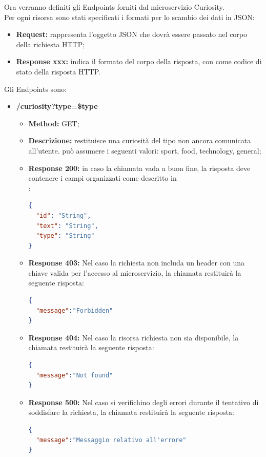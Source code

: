 Ora verranno definiti gli Endpoints forniti dal microservizio Curiosity.\\
Per ogni risorsa sono stati specificati i formati per lo scambio dei dati in JSON:
\begin{itemize}
\item \textbf{Request:} rappresenta l’oggetto JSON che dovrà essere passato nel corpo della richiesta HTTP;
\item \textbf{Response xxx:} indica il formato del corpo della risposta, con  come codice di stato della risposta HTTP.
\end{itemize}
Gli Endpoints sono:
\begin{itemize}
\item \textbf{/curiosity?type=\$type}\\
\begin{itemize}
\item \textbf{Method:} GET;
\item \textbf{Descrizione:} restituisce una curiosità del tipo  non ancora comunicata all'utente.  può assumere i seguenti valori: sport, food, technology, general;
\item \textbf{Response 200:} in caso la chiamata vada a buon fine, la risposta deve contenere i campi organizzati come descritto in \\:
\begin{lstlisting}[language=json,firstnumber=1]
{
  "id": "String",
  "text": "String",
  "type": "String"
}
\end{lstlisting}
\item \textbf{Response 403:} Nel caso la richiesta non includa un header  con una chiave valida per l'accesso al microservizio, la chiamata restituirà la seguente risposta:
\begin{lstlisting}[language=json,firstnumber=1]
{
  "message":"Forbidden"
}
\end{lstlisting}
\item \textbf{Response 404:} Nel caso la risorsa richiesta non sia disponibile, la chiamata restituirà la seguente risposta:
\begin{lstlisting}[language=json,firstnumber=1]
{
  "message":"Not found"
}
\end{lstlisting}
\item \textbf{Response 500:} Nel caso si verifichino degli errori durante il tentativo di soddisfare la richiesta, la chiamata restituirà la seguente risposta:
\begin{lstlisting}[language=json,firstnumber=1]
{
  "message":"Messaggio relativo all'errore"
}
\end{lstlisting}
\end{itemize}
\end{itemize}
\newpage
